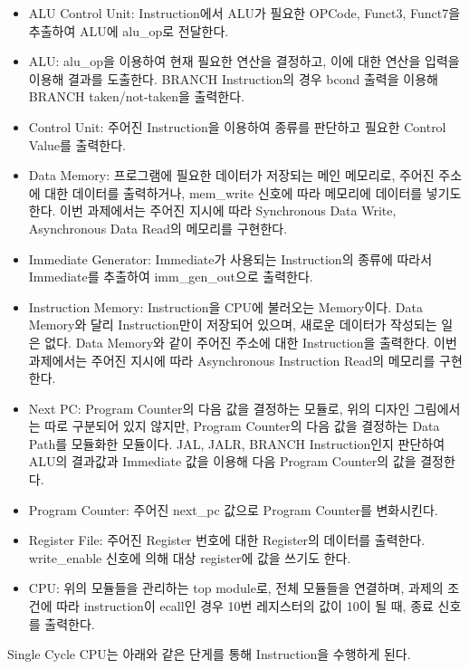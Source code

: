 \documentclass[openright, a4paper]{article}
\begin{document}
\begin{itemize}
    \item ALU Control Unit: Instruction에서 ALU가 필요한 OPCode, Funct3, Funct7을 추출하여 ALU에 alu_op로 전달한다.
    \item ALU: alu_op을 이용하여 현재 필요한 연산을 결정하고, 이에 대한 연산을 입력을 이용해 결과를 도출한다. BRANCH Instruction의 경우 bcond 출력을 이용해 BRANCH taken/not-taken을 출력한다.
    \item Control Unit: 주어진 Instruction을 이용하여 종류를 판단하고 필요한 Control Value를 출력한다.
    \item Data Memory: 프로그램에 필요한 데이터가 저장되는 메인 메모리로, 주어진 주소에 대한 데이터를 출력하거나, mem_write 신호에 따라 메모리에 데이터를 넣기도 한다. 이번 과제에서는 주어진 지시에 따라 Synchronous Data Write, Asynchronous Data Read의 메모리를 구현한다.
    \item Immediate Generator: Immediate가 사용되는 Instruction의 종류에 따라서 Immediate를 추출하여 imm_gen_out으로 출력한다.
    \item Instruction Memory: Instruction을 CPU에 불러오는 Memory이다. Data Memory와 달리 Instruction만이 저장되어 있으며, 새로운 데이터가 작성되는 일은 없다. Data Memory와 같이 주어진 주소에 대한 Instruction을 출력한다. 이번 과제에서는 주어진 지시에 따라 Asynchronous Instruction Read의 메모리를 구현한다.
    \item Next PC: Program Counter의 다음 값을 결정하는 모듈로, 위의 디자인 그림에서는 따로 구분되어 있지 않지만, Program Counter의 다음 값을 결정하는 Data Path를 모듈화한 모듈이다. JAL, JALR, BRANCH Instruction인지 판단하여 ALU의 결과값과 Immediate 값을 이용해 다음 Program Counter의 값을 결정한다.
    \item Program Counter: 주어진 next_pc 값으로 Program Counter를 변화시킨다.
    \item Register File: 주어진 Register 번호에 대한 Register의 데이터를 출력한다. write_enable 신호에 의해 대상 register에 값을 쓰기도 한다.
    \item CPU: 위의 모듈들을 관리하는 top module로, 전체 모듈들을 연결하며, 과제의 조건에 따라 instruction이 ecall인 경우 10번 레지스터의 값이 10이 될 때, 종료 신호를 출력한다.
\end{itemize}

\hfill

Single Cycle CPU는 아래와 같은 단게를 통해 Instruction을 수행하게 된다.
\end{document}
